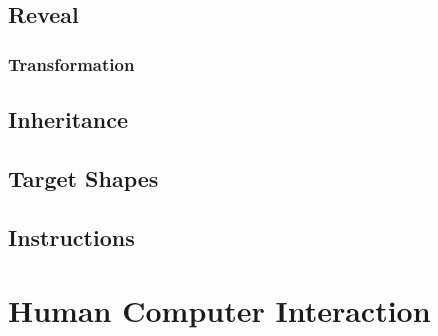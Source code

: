 \documentclass[11pt]{article}
\begin{document}
    \subsection{Reveal}
    
            \paragraph{}

        \subsubsection{Transformation}
        
                \paragraph{}

    \subsection{Inheritance}
    
            \paragraph{}

    \subsection{Target Shapes}
    
            \paragraph{}
            
    \subsection{Instructions}
    
        \paragraph{}

\newpage
\section{Human Computer Interaction}
    \paragraph{}
    
\end{document}
